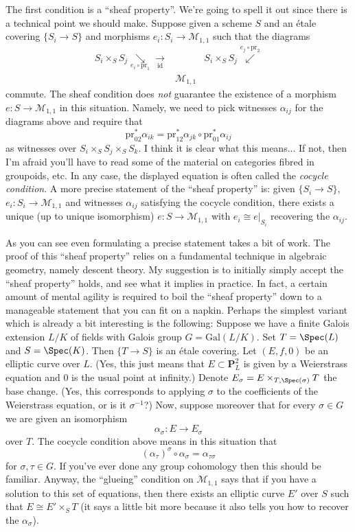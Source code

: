The first condition is a ``sheaf property''. We're going to spell it
out since there is a technical point we should make.
Suppose given a scheme $S$ and an \'etale covering $\{S_i \to S\}$
and morphisms $e_i : S_i \to \mathcal{M}_{1, 1}$ such that the diagrams
$$
\begin{array}{ccc}S_i \times_S S_j \underset{e_i \circ \text{pr}_1}{\searrow}\underset{\text{id}}{\longrightarrow} &  & S_i \times_S S_j \overset{e_j \circ \text{pr}_2}{\swarrow} \\  & \mathcal{M}_{1, 1} & \end{array}
$$
commute. The sheaf condition does {\it not} guarantee the existence of
a morphism $e : S \to \mathcal{M}_{1, 1}$ in this situation. Namely,
we need to pick witnesses $\alpha_{ij}$ for the diagrams above and
require that
$$
\text{pr}_{02}^*\alpha_{ik} =
\text{pr}_{12}^*\alpha_{jk} \circ \text{pr}_{01}^*\alpha_{ij}
$$
as witnesses over $S_i \times_S S_j \times_S S_k$. I think it is clear
what this means... If not, then I'm afraid you'll have to read some of the
material on categories fibred in groupoids, etc. In any case, the displayed
equation is often called the {\it cocycle condition}.
A more precise statement of the ``sheaf property'' is: given
$\{S_i \to S\}$, $e_i : S_i \to \mathcal{M}_{1, 1}$ and witnesses
$\alpha_{ij}$ satisfying the cocycle condition, there exists a unique
(up to unique isomorphism) $e : S \to \mathcal{M}_{1, 1}$ with
$e_i \cong e|_{S_i}$ recovering the $\alpha_{ij}$.

\medskip\noindent
As you can see even formulating a precise statement takes a bit of work.
The proof of this ``sheaf property'' relies on a fundamental
technique in algebraic geometry, namely descent theory. My suggestion
is to initially simply accept the ``sheaf property'' holds, and see what
it implies in practice. In fact, a certain amount of mental agility is
required to boil the ``sheaf property'' down to a manageable statement
that you can fit on a napkin. Perhaps the simplest variant which is
already a bit interesting is the following: Suppose we have a
finite Galois extension $L/K$ of fields with
Galois group $G = \text{Gal}(L/K)$. Set $T = \Spec(L)$ and $S = \Spec(K)$.
Then $\{T \to S\}$ is an \'etale covering.
Let $(E, f, 0)$ be an elliptic curve over $L$. (Yes, this just means
that $E \subset \mathbf{P}^2_L$ is given by a Weierstrass equation
and $0$ is the usual point at infinity.) Denote
$E_\sigma = E \times_{T, \Spec(\sigma)} T$ the base change.
(Yes, this corresponds to applying $\sigma$ to the coefficients of the
Weierstrass equation, or is it $\sigma^{-1}$?) Now, suppose moreover
that for every $\sigma \in G$ we are given an isomorphism
$$
\alpha_\sigma : E \longrightarrow E_\sigma
$$
over $T$. The cocycle condition above means in this situation that
$$
(\alpha_\tau)^\sigma \circ \alpha_\sigma = \alpha_{\tau\sigma}
$$
for $\sigma, \tau \in G$. If you've ever done any group cohomology
then this should be familiar. Anyway, the ``glueing'' condition on
$\mathcal{M}_{1, 1}$ says that if you have a solution to this
set of equations, then there exists an elliptic curve $E'$ over $S$
such that $E \cong E' \times_S T$ (it says a little bit more because
it also tells you how to recover the $\alpha_\sigma$).

